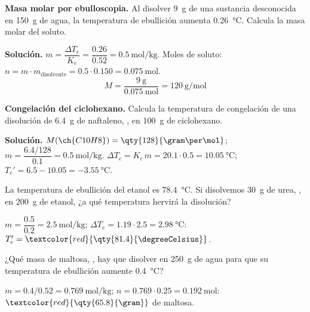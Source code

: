 \begin{example}
    \textbf{Masa molar por ebulloscopia.} Al disolver \qty{9}{\gram} de una sustancia desconocida en \qty{150}{\gram} de agua,
    la temperatura de ebullición aumenta \qty{0.26}{\degreeCelsius}. Calcula la masa molar del soluto.

    \textbf{Solución.} \(m = \dfrac{\Delta T_e}{K_e} = \dfrac{\num{0.26}}{\num{0.52}} = \qty{0.5}{\mol\per\kilo\gram}\).
    Moles de soluto: \(n = m \cdot m_{\text{disolvente}} = \num{0.5} \cdot \num{0.150} = \qty{0.075}{\mol}\).
    \[ M = \frac{\qty{9}{\gram}}{\qty{0.075}{\mol}} = \qty{120}{\gram\per\mol} \]
\end{example}

\begin{example}
    \textbf{Congelación del ciclohexano.} Calcula la temperatura de congelación de una disolución de \qty{6.4}{\gram} de
    naftaleno, , en \qty{100}{\gram} de ciclohexano.

    \textbf{Solución.} \(M(\ch{C10H8}) = \qty{128}{\gram\per\mol}\); \(m = \dfrac{\num{6.4}/128}{\num{0.1}} = \qty{0.5}{\mol\per\kilo\gram}\).
    \(\Delta T_c = K_c \, m = \num{20.1} \cdot \num{0.5} = \qty{10.05}{\degreeCelsius}\);
    \(T_c' = \num{6.5} - \num{10.05} = \qty{-3.55}{\degreeCelsius}\).
\end{example}

\begin{exercise}
    La temperatura de ebullición del etanol es \qty{78.4}{\degreeCelsius}. Si disolvemos \qty{30}{\gram} de urea,
    , en \qty{200}{\gram} de etanol, ¿a qué temperatura hervirá la disolución?
    \begin{solu}
        \(m = \dfrac{\num{0.5}}{\num{0.2}} = \qty{2.5}{\mol\per\kilo\gram}\); \(\Delta T_e = \num{1.19} \cdot \num{2.5} = \qty{2.98}{\degreeCelsius}\):
        \(T_e' = \textcolor{red}{\qty{81.4}{\degreeCelsius}}\).
    \end{solu}
\end{exercise}

\begin{exercise}
    ¿Qué masa de maltosa, , hay que disolver en \qty{250}{\gram} de agua para que su temperatura de ebullición
    aumente \qty{0.4}{\degreeCelsius}?
    \begin{solu}
        \(m = \num{0.4}/\num{0.52} = \qty{0.769}{\mol\per\kilo\gram}\); \(n = \num{0.769} \cdot \num{0.25} = \qty{0.192}{\mol}\):
        \(\textcolor{red}{\qty{65.8}{\gram}}\) de maltosa.
    \end{solu}
\end{exercise}

